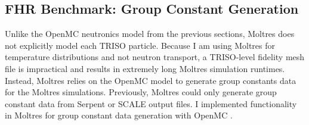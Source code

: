 \subsection{FHR Benchmark: Group Constant Generation}
\label{sec:fhr-bm-group-constant}
Unlike the OpenMC neutronics model from the previous sections, Moltres does not 
explicitly model each \gls{TRISO} particle. 
Because I am using Moltres for temperature distributions and not neutron transport, 
a TRISO-level fidelity mesh file is impractical and results in extremely long Moltres 
simulation runtimes.
Instead, Moltres relies on the OpenMC model to generate group constants data
for the Moltres simulations. 
Previously, Moltres could only generate group constant data from Serpent 
\cite{leppanen_serpent_2014} or SCALE \cite{bucholz_scale:_1982} output files. 
I implemented functionality in Moltres for group constant data generation with 
OpenMC \cite{lindsay_moltres_2017}. 

